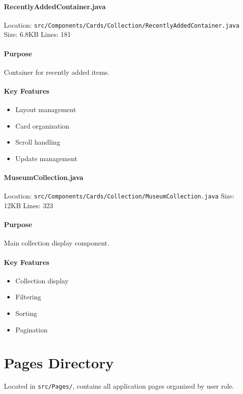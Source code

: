 \documentclass[12pt,a4paper]{article}
\begin{document}
\paragraph{RecentlyAddedContainer.java}
Location: \texttt{src/Components/Cards/Collection/RecentlyAddedContainer.java}
Size: 6.8KB
Lines: 181

\paragraph{Purpose}
Container for recently added items.

\paragraph{Key Features}
\begin{itemize}
    \item Layout management
    \item Card organization
    \item Scroll handling
    \item Update management
\end{itemize}

\paragraph{MuseumCollection.java}
Location: \texttt{src/Components/Cards/Collection/MuseumCollection.java}
Size: 12KB
Lines: 323

\paragraph{Purpose}
Main collection display component.

\paragraph{Key Features}
\begin{itemize}
    \item Collection display
    \item Filtering
    \item Sorting
    \item Pagination
\end{itemize}

\section{Pages Directory}
Located in \texttt{src/Pages/}, contains all application pages organized by user role.
\end{document}
